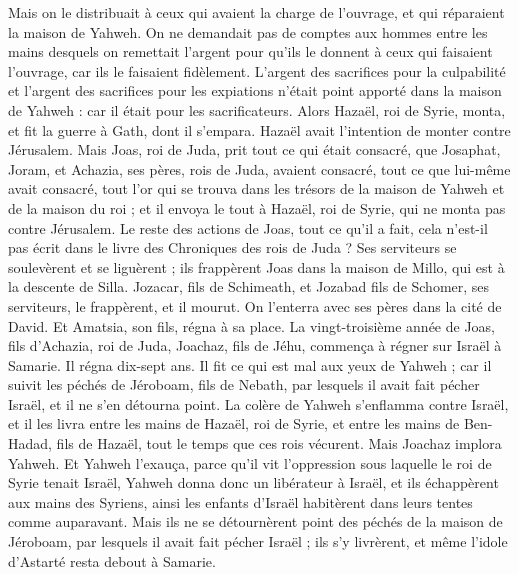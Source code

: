 \begin{multicols}{2}
Mais on le distribuait à ceux qui avaient la charge de l’ouvrage, et qui réparaient la maison de Yahweh.
On ne demandait pas de comptes aux hommes entre les mains desquels on remettait l’argent pour qu’ils le donnent à ceux qui faisaient l’ouvrage, car ils le faisaient fidèlement.
L’argent des sacrifices pour la culpabilité et l'argent des sacrifices pour les expiations n’était point apporté dans la maison de Yahweh : car il était pour les sacrificateurs.
Alors Hazaël, roi de Syrie, monta, et fit la guerre à Gath, dont il s’empara. Hazaël avait l’intention de monter contre Jérusalem.
Mais Joas, roi de Juda, prit tout ce qui était consacré, que Josaphat, Joram, et Achazia, ses pères, rois de Juda, avaient consacré, tout ce que lui-même avait consacré, tout l’or qui se trouva dans les trésors de la maison de Yahweh et de la maison du roi ; et il envoya le tout à Hazaël, roi de Syrie, qui ne monta pas contre Jérusalem.
Le reste des actions de Joas, tout ce qu’il a fait, cela n’est-il pas écrit dans le livre des Chroniques des rois de Juda ?
Ses serviteurs se soulevèrent et se liguèrent ; ils frappèrent Joas dans la maison de Millo, qui est à la descente de Silla.
Jozacar, fils de Schimeath, et Jozabad fils de Schomer, ses serviteurs, le frappèrent, et il mourut. On l’enterra avec ses pères dans la cité de David. Et Amatsia, son fils, régna à sa place.
\VerseOne{}La vingt-troisième année de Joas, fils d’Achazia, roi de Juda, Joachaz, fils de Jéhu, commença à régner sur Israël à Samarie. Il régna dix-sept ans.
Il fit ce qui est mal aux yeux de Yahweh ; car il suivit les péchés de Jéroboam, fils de Nebath, par lesquels il avait fait pécher Israël, et il ne s’en détourna point.
La colère de Yahweh s’enflamma contre Israël, et il les livra entre les mains de Hazaël, roi de Syrie, et entre les mains de Ben-Hadad, fils de Hazaël, tout le temps que ces rois vécurent.
Mais Joachaz implora Yahweh. Et Yahweh l’exauça, parce qu’il vit l’oppression sous laquelle le roi de Syrie tenait Israël,
Yahweh donna donc un libérateur à Israël, et ils échappèrent aux mains des Syriens, ainsi les enfants d’Israël habitèrent dans leurs tentes comme auparavant.
Mais ils ne se détournèrent point des péchés de la maison de Jéroboam, par lesquels il avait fait pécher Israël ; ils s’y livrèrent, et même l’idole d’Astarté resta debout à Samarie.

\end{multicols}
